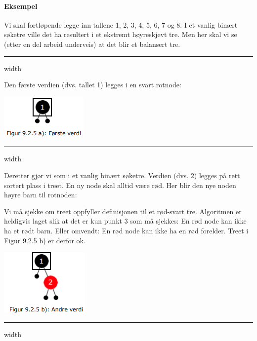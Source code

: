 \documentclass[11pt]{article}
\begin{document}
        \paragraph{Eksempel}
        Vi skal fortløpende legge inn tallene 1, 2, 3, 4, 5, 6, 7 og 8. I et vanlig
        binært søketre ville det ha resultert i et ekstremt høyreskjevt tre.
        Men her skal vi se (etter en del arbeid underveis) at det blir et balansert tre. \\

        \hrule width \textwidth

        \begin{multicols}{2}
            Den første verdien (dvs. tallet 1) legges i en svart rotnode:

            \columnbreak
            \includegraphics[center]{f-9.2.5a.png}
        \end{multicols}

        \hrule width \textwidth

        \begin{multicols}{2}
            Deretter gjør vi som i et vanlig binært søketre.
            Verdien (dvs. 2) legges på rett sortert plass i treet.
            En ny node skal alltid være rød. Her blir den nye noden høyre barn til rotnoden:

            Vi må sjekke om treet oppfyller definisjonen til et rød-svart tre. Algoritmen er heldigvis laget
            slik at det er kun punkt 3 som må sjekkes: En rød node kan ikke ha et rødt barn. Eller
            omvendt: En rød node kan ikke ha en rød forelder. Treet i Figur 9.2.5 b) er derfor ok.

            \columnbreak
            \includegraphics[center]{f-9.2.5b.png}
        \end{multicols}

        \hrule width \textwidth
\end{document}
